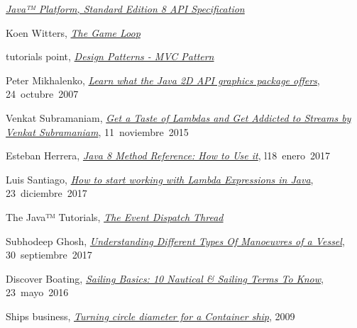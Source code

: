


\href{https://docs.oracle.com/javase/8/docs/api/}{\textit{Java™ Platform, Standard Edition 8
		API Specification}}

Koen Witters,
\href{https://dewitters.com/dewitters-gameloop/}{\textit{The Game Loop}}

tutorials point,
\href{https://www.tutorialspoint.com/design_pattern/mvc_pattern.htm}{\textit{Design Patterns - MVC Pattern}}

Peter Mikhalenko,
\href{https://www.techrepublic.com/blog/software-engineer/learn-what-the-java-2d-api-graphics-package-offers/}{\textit{Learn what the Java 2D API graphics package offers}},
\mbox{24 octubre 2007}

Venkat Subramaniam,
\href{https://youtu.be/1OpAgZvYXLQ}{\textit{Get a Taste of Lambdas and Get Addicted to Streams by Venkat Subramaniam}},
\mbox{11 noviembre 2015}

Esteban Herrera,
\href{https://www.codementor.io/eh3rrera/using-java-8-method-reference-du10866vx}{\textit{Java 8 Method Reference: How to Use it}},
\mbox{l18 enero 2017}

Luis Santiago,
\href{https://www.freecodecamp.org/news/learn-these-4-things-and-working-with-lambda-expressions-b0ab36e0fffc/}{\textit{How to start working with Lambda Expressions in Java}},
\mbox{23 diciembre 2017}

The Java™ Tutorials,
\href{https://docs.oracle.com/javase/tutorial/uiswing/concurrency/dispatch.html}{\textit{The Event Dispatch Thread}}

Subhodeep Ghosh,
\href{https://www.marineinsight.com/naval-architecture/different-types-of-manoeuvres-of-a-vessel/}{\textit{Understanding Different Types Of Manoeuvres of a Vessel}},
\mbox{30 septiembre 2017}

Discover Boating,
\href{https://www.discoverboating.com/resources/sailing-basics-10-nautical-sailing-terms-to-know}{\textit{Sailing Basics: 10 Nautical \& Sailing Terms To Know}},
\mbox{23 mayo 2016}

Ships business,
\href{http://shipsbusiness.com/turning-circle.html}{\textit{Turning circle diameter for a Container ship}},
\mbox{2009}

